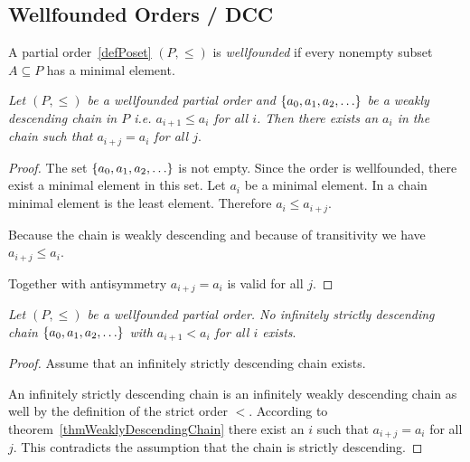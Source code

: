 \subsection{Wellfounded Orders / DCC}

\begin{definition}
    \label{defWellfoundedOrder}
    A partial order~\ref{defPoset} $(P,\le)$ is \emph{wellfounded} if every
    nonempty subset $A \subseteq P$ has a minimal element.
\end{definition}








\begin{theorem}
    \label{thmWeaklyDescendingChain}
    \emph{Let $(P, \le)$ be a wellfounded partial order and $\left\{a_0, a_1,
    a_2, \ldots\right\}$ be a weakly descending chain in $P$ i.e. $a_{i+1} \le a_i$ for
    all $i$. Then there exists an $a_i$ in the chain such that $a_{i+j} = a_i$
    for all $j$}.

    \begin{proof}
        The set $\left\{a_0, a_1, a_2, \ldots\right\}$ is not empty. Since the order is
        wellfounded, there exist a minimal element in this set. Let $a_i$ be a
        minimal element. In a chain minimal element is the least element.
        Therefore $a_i \le a_{i+j}$.

        Because the chain is weakly descending and because of transitivity we
        have $a_{i+j} \le a_i$.

        Together with antisymmetry $a_{i+j} = a_i$ is valid for all $j$.
    \end{proof}
\end{theorem}





\begin{theorem}
    \label{thmDCC}
    \emph{Let $(P, \le)$ be a wellfounded partial order. No infinitely strictly
    descending chain $\left\{a_0, a_1, a_2, \ldots\right\}$ with $a_{i+1} < a_i$ for all
    $i$ exists}.

    \begin{proof}
        Assume that an infinitely strictly descending chain exists.

        An infinitely strictly descending chain is an infinitely weakly
        descending chain as well by the definition of the strict order $<$.
        According to theorem~\ref{thmWeaklyDescendingChain} there exist an $i$
        such that $a_{i + j} = a_i$ for all $j$.  This contradicts the
        assumption that the chain is strictly descending.
    \end{proof}
\end{theorem}



